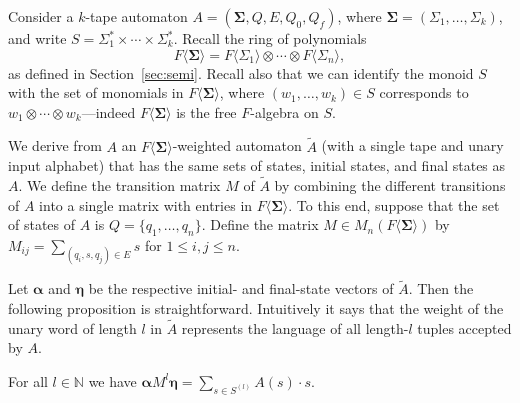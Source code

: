 \documentclass[runningheads]{llncs}
\newcommand{\valpha}{\boldsymbol{\alpha}}
\newcommand{\veta}{\boldsymbol{\eta}}
\begin{document}
Consider a $k$-tape automaton $A=(\boldsymbol{\Sigma},Q,E,Q_0,Q_f)$,
where $\boldsymbol{\Sigma} = (\Sigma_1,\ldots,\Sigma_k)$, and write
$S=\Sigma_1^*\times \cdots \times \Sigma_k^*$.  Recall the ring of
polynomials \[ F \langle \boldsymbol{\Sigma} \rangle = F\langle
\Sigma_1\rangle \otimes \cdots \otimes F\langle \Sigma_n\rangle,\] as
defined in Section~\ref{sec:semi}.  Recall also that we can identify
the monoid $S$ with the set of monomials in $F \langle
\boldsymbol{\Sigma} \rangle$, where $(w_1,\ldots,w_k) \in S$ corresponds to
$w_1 \otimes \cdots \otimes w_k$---indeed $F \langle
\boldsymbol{\Sigma} \rangle$ is the free $F$-algebra on $S$.

We derive from $A$ an $F \langle \boldsymbol{\Sigma} \rangle$-weighted
automaton $\widetilde{A}$ (with a single tape and unary input
alphabet) that has the same sets of states, initial states, and final
states as $A$.  We define the transition matrix $M$ of $\widetilde{A}$ by
combining the different transitions of $A$ into a single matrix with
entries in $F \langle \boldsymbol{\Sigma} \rangle$.  To this
end, suppose that the set of states of $A$ is $Q=\{q_1,\ldots,q_n\}$.
Define the matrix $M \in M_n(F \langle \boldsymbol{\Sigma} \rangle)$
by $M_{ij} = \sum_{(q_i,s,q_j)\in E} s$ for $1 \leq i,j \leq n$.

Let $\valpha$ and $\veta$ be the respective initial- and final-state
vectors of $\widetilde{A}$.  Then the following proposition is
straightforward.  Intuitively it says that the weight of the unary
word of length $l$ in $\widetilde{A}$ represents the language of all
length-$l$ tuples accepted by $A$.
\begin{proposition}
For all $l \in \mathbb{N}$ we have
$\valpha M^l \veta = \sum_{s\in S^{(l)}} A(s) \cdot s$.
\label{prop:matrix}
\end{proposition}
\end{document}
